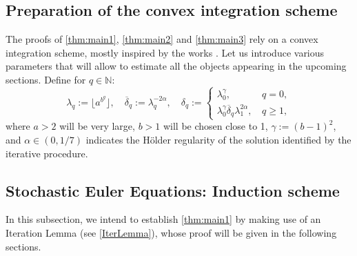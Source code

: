 \documentclass[10pt,a4paper]{amsart}
\numberwithin{equation}{section}
\numberwithin{corollario}{section}
\numberwithin{lemma}{section}
\numberwithin{prop}{section}
\theoremstyle{definition}
\theoremstyle{remark}
\newcommand{\N}{\mathbb{N}}
\newcommand{\odelta}{\overline{\delta}}
\begin{document}
\subsection{Preparation of the convex integration scheme}\label{subsec:prep}
The proofs of \autoref{thm:main1}, \autoref{thm:main2} and \autoref{thm:main3} rely on a convex integration scheme, mostly inspired by the works \cite{Is22,DLK23,LuLuZh25}.
Let us introduce various parameters that will allow to estimate all the objects appearing in the upcoming sections. Define for $q \in \N$: 
\[\lambda_q:= \lfloor a^{b^q} \rfloor,\quad \odelta_q:=\lambda_q^{-2\alpha},\quad \delta_q:=\begin{cases}
    \lambda_0^{\gamma}, \, &q=0,\\
    \lambda_0^{\gamma}\odelta_q\lambda_1^{2\alpha},\,&q\geq 1,
\end{cases}\]
where $a>2$ will be very large, $b>1$ will be chosen close to 1, $\gamma := (b-1)^2$, and $\alpha\in (0,1/7)$ indicates the H\"older regularity of the solution identified by the iterative procedure.

\subsection{ Stochastic Euler Equations: Induction scheme}\label{ssec:SE_InductionScheme} 
In this subsection, we intend to establish \autoref{thm:main1} by making use of an Iteration Lemma (see \autoref{IterLemma}), whose proof will be given in the following sections.
\end{document}
